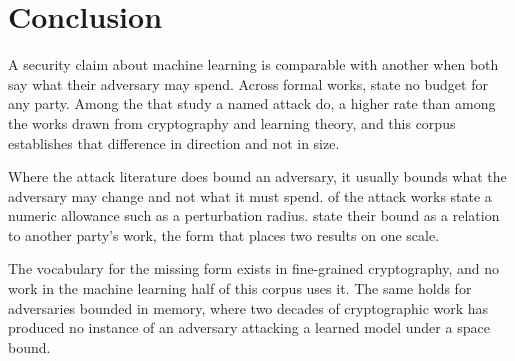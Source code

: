 \section{Conclusion}
\label{sec:conclusion}

A security claim about machine learning is comparable with another when both say
what their adversary may spend. Across \NumSources{} formal works,
\NumUnstated{} state no budget for any party. Among the \NumAttackWorks{} that
study a named attack \AttackUnbound{} do, a higher rate than among the works
drawn from cryptography and learning theory, and this corpus establishes that
difference in direction and not in size.

Where the attack literature does bound an adversary, it usually bounds what the
adversary may change and not what it must spend. \AttackBudget{} of the
\NumAttackWorks{} attack works state a numeric allowance such as a perturbation
radius. \NumRelativeAttack{} state their bound as a relation to another party's
work, the form that places two results on one scale.

The vocabulary for the missing form exists in fine-grained cryptography, and no
work in the machine learning half of this corpus uses it. The same holds for
adversaries bounded in memory, where two decades of cryptographic work has
produced no instance of an adversary attacking a learned model under a space
bound.
